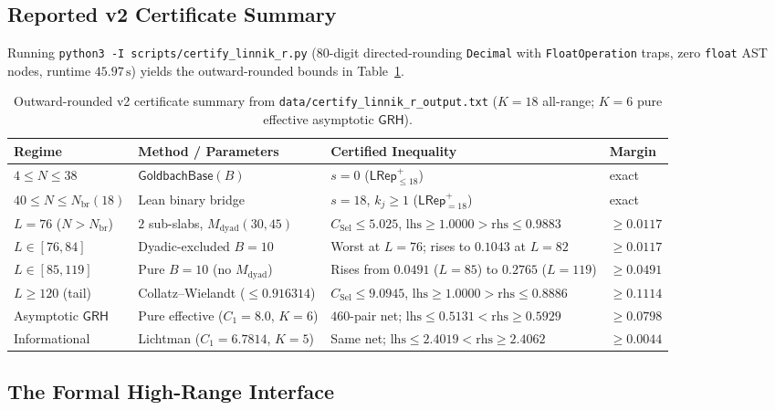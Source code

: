\documentclass[11pt,a4paper]{article}
\newcommand{\GoldbachBase}{\mathsf{GoldbachBase}}
\newcommand{\LRepPos}[1]{\mathsf{LRep}^{+}_{=#1}}
\newcommand{\LRepLe}[1]{\mathsf{LRep}^{+}_{\le #1}}
\newcommand{\GRH}{\mathsf{GRH}}
\begin{document}
\subsection{Reported v2 Certificate Summary}

Running \texttt{python3 -I scripts/certify\_linnik\_r.py} (80-digit directed-rounding \texttt{Decimal} with \texttt{FloatOperation} traps, zero \texttt{float} AST nodes, runtime $45.97\,\mathrm{s}$) yields the outward-rounded bounds in Table~\ref{tab:cert}.

\begin{table}[ht]
\centering
\caption{Outward-rounded v2 certificate summary from \texttt{data/certify\_linnik\_r\_output.txt} ($K = 18$ all-range; $K = 6$ pure effective asymptotic $\GRH$).}
\label{tab:cert}
\footnotesize
\begin{tabularx}{\textwidth}{@{}l l X l@{}}
\toprule
Regime & Method / Parameters & Certified Inequality & Margin \\
\midrule
$4 \le N \le 38$ & $\GoldbachBase(B)$ & $s = 0$ ($\LRepLe{18}$) & exact \\
$40 \le N \le N_{\mathrm{br}}(18)$ & Lean binary bridge & $s = 18$, $k_j \ge 1$ ($\LRepPos{18}$) & exact \\
$L = 76$ ($N > N_{\mathrm{br}}$) & $2$ sub-slabs, $M_{\mathrm{dyad}}(30,45)$ & $C_{\mathrm{Sel}} \le 5.025$, $\mathrm{lhs} \ge 1.0000 > \mathrm{rhs} \le 0.9883$ & $\ge 0.0117$ \\
$L \in [76, 84]$ & Dyadic-excluded $B=10$ & Worst at $L = 76$; rises to $0.1043$ at $L = 82$ & $\ge 0.0117$ \\
$L \in [85, 119]$ & Pure $B=10$ (no $M_{\mathrm{dyad}}$) & Rises from $0.0491$ ($L=85$) to $0.2765$ ($L=119$) & $\ge 0.0491$ \\
$L \ge 120$ (tail) & Collatz--Wielandt ($\le 0.916314$) & $C_{\mathrm{Sel}} \le 9.0945$, $\mathrm{lhs} \ge 1.0000 > \mathrm{rhs} \le 0.8886$ & $\ge 0.1114$ \\
Asymptotic $\GRH$ & Pure effective ($C_1 = 8.0$, $K=6$) & $460$-pair net; $\mathrm{lhs} \le 0.5131 < \mathrm{rhs} \ge 0.5929$ & $\ge 0.0798$ \\
Informational & Lichtman ($C_1 = 6.7814$, $K=5$) & Same net; $\mathrm{lhs} \le 2.4019 < \mathrm{rhs} \ge 2.4062$ & $\ge 0.0044$ \\
\bottomrule
\end{tabularx}
\end{table}

\subsection{The Formal High-Range Interface}
\end{document}
